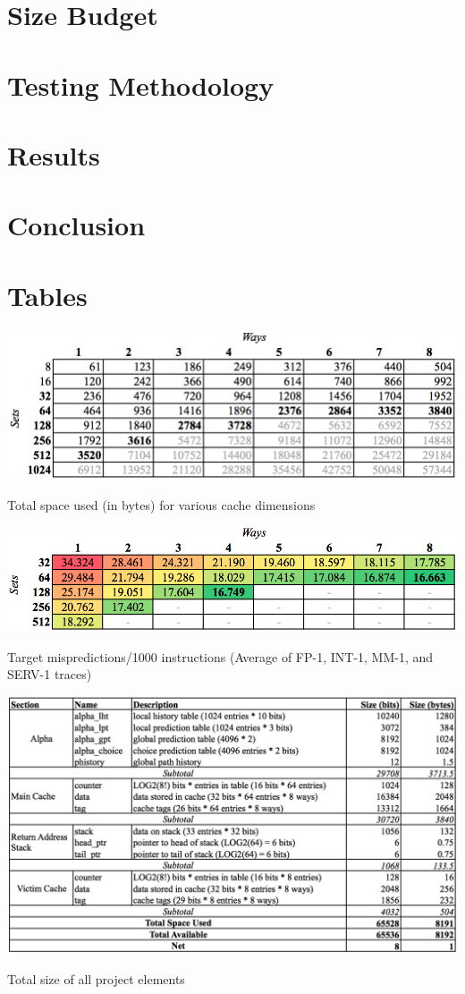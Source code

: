 \documentclass[twocolumn]{article}
\newcommand{\centertable}[3]{
\begin{table}[ht!]  
\begin{center} #1
\caption{#2}
\label{#3}
\end{center}
\end{table}}
\begin{document}
\section{Size Budget}
\section{Testing Methodology}
\section{Results}
\section{Conclusion}
\appendix
\onecolumn
\section{Tables}
\vspace{-.15in}\centertable{\includegraphics[width=5.25in]{img/sizebydim.png}}{Total space used (in bytes) for various cache dimensions}{sizebydim}
\vspace{-.35in}\centertable{\includegraphics[width=5.25in]{img/mispersize.png}}{Target mispredictions/1000 instructions (Average of FP-1, INT-1, MM-1, and SERV-1 traces)}{mispersize}
\centertable{\includegraphics[width=\columnwidth]{img/sizebudget.png}}{Total size of all project elements}{sizebudget}
\end{document}
